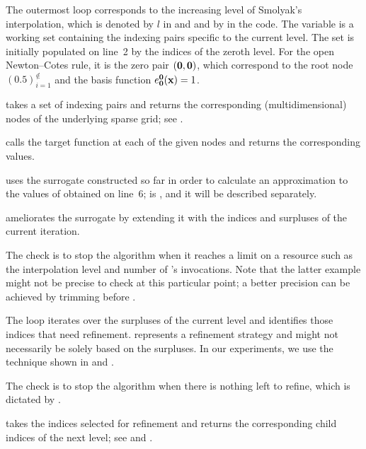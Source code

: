 \begin{compactlist}

 The outermost loop corresponds to the increasing level of
Smolyak's interpolation, which is denoted by $l$ in  and
 and by  in the code. The 
variable is a working set containing the indexing pairs specific to the current
level. The set is initially populated on line~2 by the indices of the zeroth
level. For the open Newton--Cotes rule, it is the zero pair $(\mathbf{0}, \mathbf{0})$,
which correspond to the root node $(0.5)_{i = 1}^\nin$ and the basis function
$e^{\mathbf{0}}_{\mathbf{0}}(\mathbf{x}) = 1$.

  takes a set of indexing pairs and returns
the corresponding (multidimensional) nodes of the underlying sparse grid; see
.

  calls the target function at each of the given
nodes and returns the corresponding values.

  uses the surrogate constructed so far in order
to calculate an approximation to the values of  obtained on
line~6;  is , and it will be described
separately.

  ameliorates the surrogate by extending it with
the indices and surpluses of the current iteration.

 The check is to stop the algorithm when it reaches a limit on a
resource such as the interpolation level and number of 's
invocations. Note that the latter example might not be precise to check at this
particular point; a better precision can be achieved by trimming 
before .

 The loop iterates over the surpluses of the current level and
identifies those indices that need refinement. 
represents a refinement strategy and might not necessarily be solely based on
the surpluses. In our experiments, we use the technique shown in
 and .

 The check is to stop the algorithm when there is nothing left
to refine, which is dictated by .

  takes the indices selected for
refinement and returns the corresponding child indices of the next level; see
 and .

\end{compactlist}

